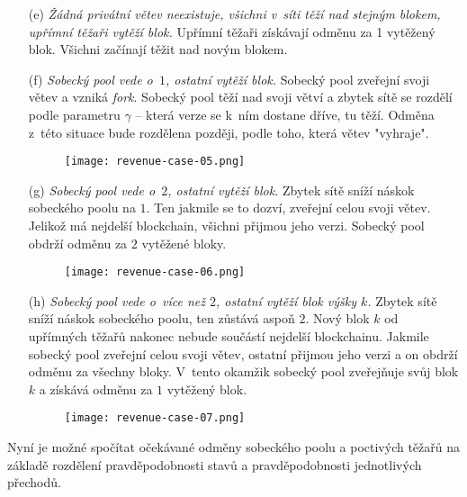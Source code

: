 \begin{enumerate}
    \item[(e)] \textit{Žádná privátní větev neexistuje, všichni v~síti těží nad stejným blokem, upřímní těžaři vytěží blok.} Upřímní těžaři získávají odměnu za 1 vytěžený blok. Všichni začínají těžit nad novým blokem.

    \item[(f)] \textit{Sobecký pool vede o~$1$, ostatní vytěží blok.} Sobecký pool zveřejní svoji větev a vzniká \textit{fork}. Sobecký pool těží nad svoji větví a zbytek sítě se rozdělí podle parametru $\gamma$ -- která verze se k~ním dostane dříve, tu těží. Odměna z~této situace bude rozdělena později, podle toho, která větev "vyhraje".

    \begin{figure}[H]
        \centering
        \texttt{[image: revenue-case-05.png]}
    \end{figure}

    \item[(g)] \textit{Sobecký pool vede o~$2$, ostatní vytěží blok.} Zbytek sítě sníží náskok sobeckého poolu na $1$. Ten jakmile se to dozví, zveřejní celou svoji větev. Jelikož má nejdelší blockchain, všichni přijmou jeho verzi. Sobecký pool obdrží odměnu za $2$ vytěžené bloky.

    \begin{figure}[H]
        \centering
        \texttt{[image: revenue-case-06.png]}
    \end{figure}

    \item[(h)] \textit{Sobecký pool vede o~více než $2$, ostatní vytěží blok výšky $k$.} Zbytek sítě sníží náskok sobeckého poolu, ten zůstává aspoň $2$. Nový blok $k$ od upřímných těžařů nakonec nebude součástí nejdelší blockchainu. Jakmile sobecký pool zveřejní celou svoji větev, ostatní přijmou jeho verzi a on obdrží odměnu za všechny bloky. V~tento okamžik sobecký pool zveřejňuje svůj blok $k$ a získává odměnu za $1$ vytěžený blok.

    \begin{figure}[H]
        \centering
        \texttt{[image: revenue-case-07.png]}
    \end{figure}

\end{enumerate}

Nyní je možné spočítat očekávané odměny sobeckého poolu a poctivých těžařů na základě rozdělení pravděpodobnosti stavů a pravděpodobnosti jednotlivých přechodů.

